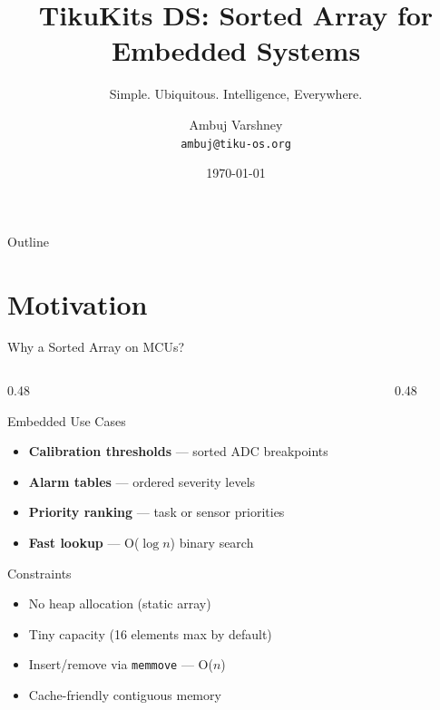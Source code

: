 \documentclass[aspectratio=169, 10pt]{beamer}
\title[TikuKits DS]{TikuKits DS: Sorted Array for Embedded Systems}
\subtitle{Simple. Ubiquitous. Intelligence, Everywhere.}
\author[Ambuj Varshney]{Ambuj Varshney \\ \texttt{ambuj@tiku-os.org}}
\date{\today}
\begin{document}
\begin{frame}
\titlepage
\end{frame}

\begin{frame}{Outline}
\tableofcontents
\end{frame}

\section{Motivation}

\begin{frame}{Why a Sorted Array on MCUs?}
\begin{columns}[T]
\begin{column}{0.48\textwidth}
\begin{block}{Embedded Use Cases}
\begin{itemize}
  \item \textbf{Calibration thresholds} --- sorted ADC breakpoints
  \item \textbf{Alarm tables} --- ordered severity levels
  \item \textbf{Priority ranking} --- task or sensor priorities
  \item \textbf{Fast lookup} --- O($\log n$) binary search
\end{itemize}
\end{block}

\begin{block}{Constraints}
\begin{itemize}
  \item No heap allocation (static array)
  \item Tiny capacity (16 elements max by default)
  \item Insert/remove via \texttt{memmove} --- O($n$)
  \item Cache-friendly contiguous memory
\end{itemize}
\end{block}
\end{column}

\begin{column}{0.48\textwidth}
\begin{center}
\end{center}
\end{column}
\end{columns}
\end{frame}
\end{document}
